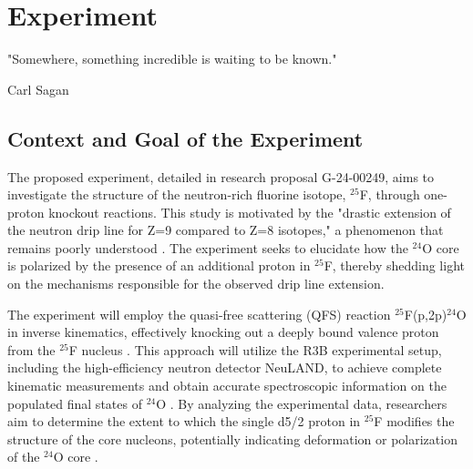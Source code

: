 
%

\makeatletter
\newcommand{\ntifpkgloaded}{%
  \@ifpackageloaded%
}
\makeatother


\chapter{Experiment}
\label{cha:experiment}

\epigraph{
	"Somewhere, something incredible is waiting to be known."
}{Carl Sagan}



\section{Context and Goal of the Experiment} %
\label{sec:contex_goal_experiment}

The proposed experiment, detailed in research proposal G-24-00249, aims to investigate the structure of the neutron-rich fluorine isotope, $^{25}$F, through one-proton knockout reactions. This study is motivated by the "drastic extension of the neutron drip line for Z=9 compared to Z=8 isotopes," a phenomenon that remains poorly understood \cite{ahn_location_2019}. The experiment seeks to elucidate how the $^{24}$O core is polarized by the presence of an additional proton in $^{25}$F, thereby shedding light on the mechanisms responsible for the observed drip line extension.

The experiment will employ the quasi-free scattering (QFS) reaction $^{25}$F(p,2p)$^{24}$O in inverse kinematics, effectively knocking out a deeply bound valence proton from the $^{25}$F nucleus \cite{panin_exclusive_2016}. This approach will utilize the R3B experimental setup, including the high-efficiency neutron detector NeuLAND, to achieve complete kinematic measurements and obtain accurate spectroscopic information on the populated final states of $^{24}$O \cite{boretzky_neuland_2021}. By analyzing the experimental data, researchers aim to determine the extent to which the single d5/2 proton in $^{25}$F modifies the structure of the core nucleons, potentially indicating deformation or polarization of the $^{24}$O core \cite{macchiavelli_core_2020}.

